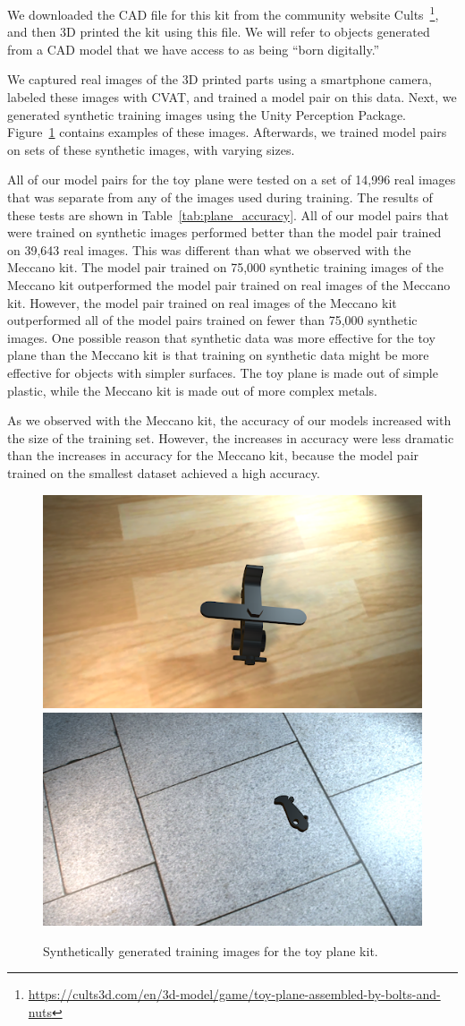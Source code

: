 We downloaded the CAD file for this kit from the community website
Cults~\footnote{\url{https://cults3d.com/en/3d-model/game/toy-plane-assembled-by-bolts-and-nuts}},
and then 3D printed the kit using this file.
We will refer to objects generated from a CAD model that we have access to as
being ``born digitally.''

We captured real images of the 3D printed parts using a smartphone camera,
labeled these images with CVAT, and trained a model pair on this data.
Next, we generated synthetic training images using the Unity Perception Package.
Figure~\ref{fig:plane_train} contains examples of these images.
Afterwards, we trained model pairs on sets of these synthetic images, with
varying sizes.

All of our model pairs for the toy plane were tested on a set of 14,996 real
images that was separate from any of the images used during training.
The results of these tests are shown in Table~\ref{tab:plane_accuracy}.
All of our model pairs that were trained on synthetic images performed better
than the model pair trained on 39,643 real images.
This was different than what we observed with the Meccano kit.
The model pair trained on 75,000 synthetic training images of the Meccano
kit outperformed the model pair trained on real images of the Meccano kit.
However, the model pair trained on real images of the Meccano kit outperformed
all of the model pairs trained on fewer than 75,000 synthetic images.
One possible reason that synthetic data was more effective for the toy plane
than the Meccano kit is that training on synthetic data might be more effective
for objects with simpler surfaces.
The toy plane is made out of simple plastic, while the Meccano kit is made out
of more complex metals.

As we observed with the Meccano kit, the accuracy of our models increased with
the size of the training set.
However, the increases in accuracy were less dramatic than the increases in
accuracy for the Meccano kit, because the model pair trained on the smallest
dataset achieved a high accuracy.

\begin{figure}
  \includegraphics[width=0.5\columnwidth]{figures/synthetic/plane_train1.png}
  \includegraphics[width=0.5\columnwidth]{figures/synthetic/plane_train2.png}
  \caption{
    Synthetically generated training images for the toy plane kit.
  }\label{fig:plane_train}
\end{figure}

